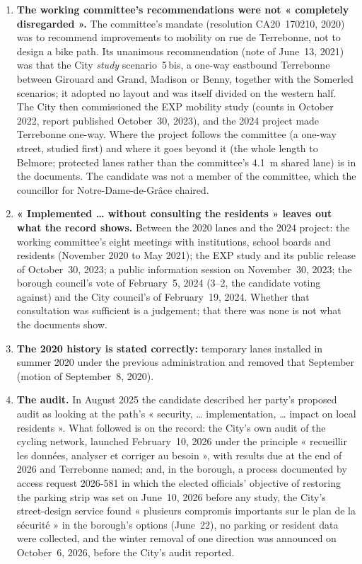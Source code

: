 \documentclass[11pt,letterpaper]{article}
\begin{document}
\begin{enumerate}[nosep]
\item \textbf{The working committee's recommendations were not « completely disregarded ».} The committee's mandate (resolution CA20~170210, 2020) was to recommend improvements to mobility on rue de Terrebonne, not to design a bike path. Its unanimous recommendation (note of June~13, 2021) was that the City \emph{study} scenario~5\,bis, a one-way eastbound Terrebonne between Girouard and Grand, Madison or Benny, together with the Somerled scenarios; it adopted no layout and was itself divided on the western half. The City then commissioned the EXP mobility study (counts in October 2022, report published October~30, 2023), and the 2024 project made Terrebonne one-way. Where the project follows the committee (a one-way street, studied first) and where it goes beyond it (the whole length to Belmore; protected lanes rather than the committee's 4.1~m shared lane) is in the documents. The candidate was not a member of the committee, which the councillor for Notre-Dame-de-Grâce chaired.
\item \textbf{« Implemented … without consulting the residents » leaves out what the record shows.} Between the 2020 lanes and the 2024 project: the working committee's eight meetings with institutions, school boards and residents (November 2020 to May 2021); the EXP study and its public release of October~30, 2023; a public information session on November~30, 2023; the borough council's vote of February~5, 2024 (3--2, the candidate voting against) and the City council's of February~19, 2024. Whether that consultation was sufficient is a judgement; that there was none is not what the documents show.
\item \textbf{The 2020 history is stated correctly:} temporary lanes installed in summer 2020 under the previous administration and removed that September (motion of September~8, 2020).
\item \textbf{The audit.} In August 2025 the candidate described her party's proposed audit as looking at the path's « security, … implementation, … impact on local residents ». What followed is on the record: the City's own audit of the cycling network, launched February~10, 2026 under the principle « recueillir les données, analyser et corriger au besoin », with results due at the end of 2026 and Terrebonne named; and, in the borough, a process documented by access request 2026-581 in which the elected officials' objective of restoring the parking strip was set on June~10, 2026 before any study, the City's street-design service found « plusieurs compromis importants sur le plan de la sécurité » in the borough's options (June~22), no parking or resident data were collected, and the winter removal of one direction was announced on October~6, 2026, before the City's audit reported.

\end{enumerate}
\end{document}

